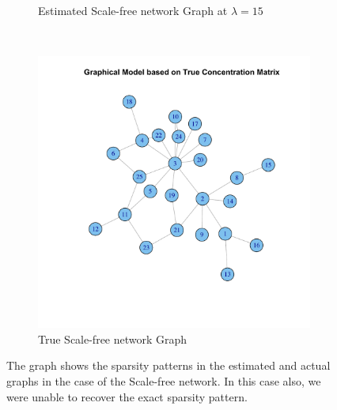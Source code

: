 \documentclass[12pt, leqno]{article}
\begin{document}
\begin{figure}
\begin{subfigure}[b]{0.40\textwidth}
  \caption{Estimated Scale-free network Graph at $\lambda = 15$}
\label{fig:nearestgaphsestimate}
\end{subfigure}\\
\begin{subfigure}[b]{0.50\textwidth}
  \includegraphics [width=\textwidth]{barabasigraphactual.pdf}
  \caption{True Scale-free network Graph}
\label{fig:nearestgaphsactual}
\end{subfigure}
        \caption{The graph shows the sparsity patterns in the
          estimated and actual graphs in the case of the Scale-free network. In this case also, we were unable to recover
          the exact sparsity pattern.}\label{fig:baragraph}
\end{figure}

\pagebreak 
\end{document}
